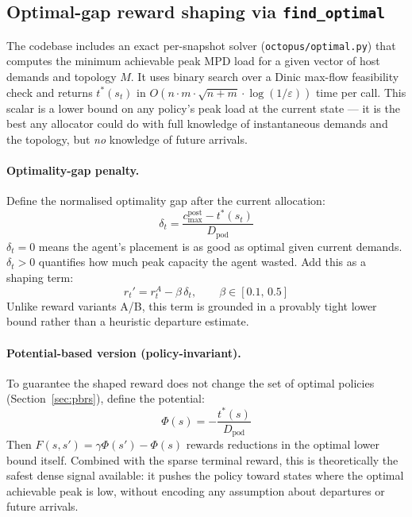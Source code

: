 \documentclass[11pt]{article}
\begin{document}
\subsection{Optimal-gap reward shaping via \texttt{find\_optimal}}

The codebase includes an exact per-snapshot solver (\texttt{octopus/optimal.py})
that computes the minimum achievable peak MPD load for a given vector of host
demands and topology $M$.  It uses binary search over a Dinic max-flow feasibility
check and returns $t^*(s_t)$ in $O(n \cdot m \cdot \sqrt{n+m} \cdot \log(1/\varepsilon))$
time per call.  This scalar is a lower bound on any policy's peak load at the
current state --- it is the best any allocator could do with full knowledge of
instantaneous demands and the topology, but \emph{no} knowledge of future arrivals.

\paragraph{Optimality-gap penalty.}
Define the normalised optimality gap after the current allocation:
\begin{equation}
  \delta_t = \frac{c_{\max}^{\text{post}} - t^*(s_t)}{D_{\text{pod}}}
  \label{eq:opt_gap}
\end{equation}
$\delta_t = 0$ means the agent's placement is as good as optimal given current
demands.  $\delta_t > 0$ quantifies how much peak capacity the agent wasted.
Add this as a shaping term:
\begin{equation}
  r_t' = r_t^A - \beta\,\delta_t, \qquad \beta \in [0.1,\,0.5]
  \label{eq:opt_gap_reward}
\end{equation}
Unlike reward variants A/B, this term is grounded in a provably tight lower bound
rather than a heuristic departure estimate.

\paragraph{Potential-based version (policy-invariant).}
To guarantee the shaped reward does not change the set of optimal policies
(Section~\ref{sec:pbrs}), define the potential:
\begin{equation}
  \Phi(s) = -\frac{t^*(s)}{D_{\text{pod}}}
  \label{eq:opt_potential}
\end{equation}
Then $F(s, s') = \gamma\Phi(s') - \Phi(s)$ rewards reductions in the optimal
lower bound itself.  Combined with the sparse terminal reward, this is
theoretically the safest dense signal available: it pushes the policy toward
states where the optimal achievable peak is low, without encoding any assumption
about departures or future arrivals.
\end{document}
